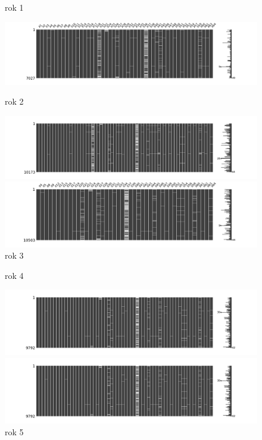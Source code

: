\documentclass[11pt]{article}
\begin{document}
\begin{figure}[h]
\caption{rok 1}
	\includegraphics[width=\textwidth]{year_1}
\caption{rok 2}
	\includegraphics[width=\textwidth]{year_2}
\caption{rok 3}
	\includegraphics[width=\textwidth]{year_3}
\end{figure}
\begin{figure}[h]
\caption{rok 4}
	\includegraphics[width=\textwidth]{year_4}
\caption{rok 5}
	\includegraphics[width=\textwidth]{year_5}
\end{figure}
\end{document}
